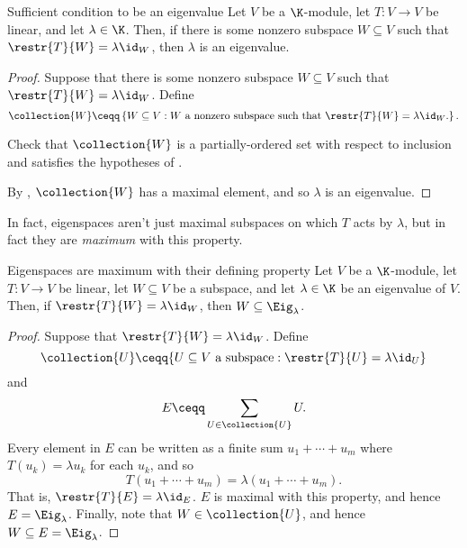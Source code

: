 \begin{prp}{Sufficient condition to be an eigenvalue}{}
	Let $V$ be a $\K$-module, let $T\colon V\rightarrow V$ be linear, and let $\lambda \in \K$.  Then, if there is some nonzero subspace $W\subseteq V$ such that $\restr{T}{W}=\lambda \id _W$, then $\lambda$ is an eigenvalue.
	\begin{proof}
		Suppose that there is some nonzero subspace $W\subseteq V$ such that $\restr{T}{W}=\lambda \id _W$.  Define
		\begin{equation}
			\collection{W}\ceqq \left\{ W\subseteq V:W\text{ a nonzero subspace such that }\restr{T}{W}=\lambda \id _W\text{.}\right\} .
		\end{equation}
		\begin{exr}[breakable=false]{}{}
			Check that $\collection{W}$ is a partially-ordered set with respect to inclusion and satisfies the hypotheses of .
		\end{exr}
		By , $\collection{W}$ has a maximal element, and so $\lambda$ is an eigenvalue.
	\end{proof}
\end{prp}
In fact, eigenspaces aren't just maximal subspaces on which $T$ acts by $\lambda$, but in fact they are \emph{maximum} with this property.
\begin{prp}{Eigenspaces are maximum with their defining property}{}
	Let $V$ be a $\K$-module, let $T\colon V\rightarrow V$ be linear, let $W\subseteq V$ be a subspace, and let $\lambda \in \K$ be an eigenvalue of $V$.  Then, if $\restr{T}{W}=\lambda \id _W$, then $W\subseteq \Eig _{\lambda}$.
	\begin{proof}
		Suppose that $\restr{T}{W}=\lambda \id _W$.  Define
		\begin{equation}
			\collection{U}\ceqq \{ U\subseteq V\text{ a subspace}:\restr{T}{U}=\lambda \id _U\} 
		\end{equation}
		and
		\begin{equation}
			E\ceqq \sum _{U\in \collection{U}}U.
		\end{equation}
		Every element in $E$ can be written as a finite sum $u_1+\cdots +u_m$ where $T(u_k)=\lambda u_k$ for each $u_k$, and so
		\begin{equation}
			T(u_1+\cdots +u_m)=\lambda (u_1+\cdots +u_m).
		\end{equation}
		That is, $\restr{T}{E}=\lambda \id _E$.  $E$ is maximal with this property, and hence $E=\Eig _{\lambda}$.  Finally, note that $W\in \collection{U}$, and hence $W\subseteq E=\Eig _{\lambda}$. 
	\end{proof}
\end{prp}
